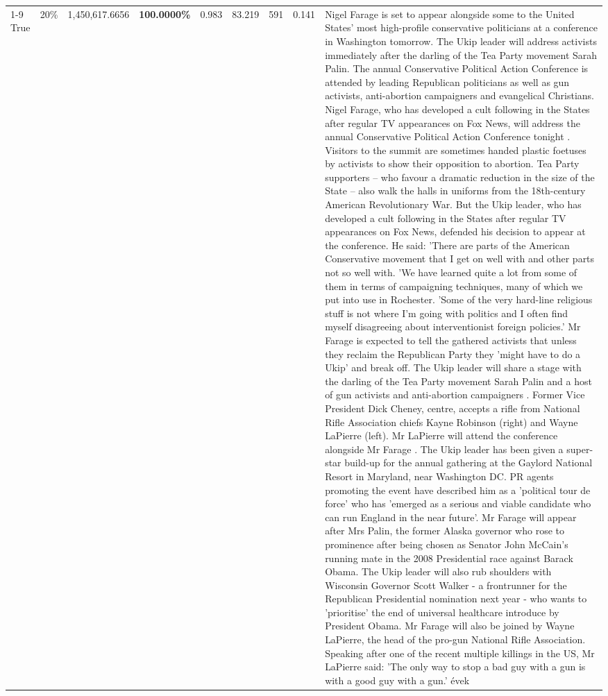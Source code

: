 \begin{table}[H]
\begin{tabular}{lllrlllll}
\cline{1-9} \cline{2-9}
True & 20\% & 1,450,617.6656 & \bfseries \color{red} 100.0000\% & 0.983 & 83.219 & 591 & 0.141 & Nigel Farage is set to appear alongside some to the United States' most high-profile conservative politicians at a conference in Washington tomorrow. The Ukip leader will address activists immediately after the darling of the Tea Party movement Sarah Palin. The annual Conservative Political Action Conference is attended by leading Republican politicians as well as gun activists, anti-abortion campaigners and evangelical Christians. Nigel Farage, who has developed a cult following in the States after regular TV appearances on Fox News, will address the annual Conservative Political Action Conference tonight . Visitors to the summit are sometimes handed plastic foetuses by activists to show their opposition to abortion. Tea Party supporters – who favour a dramatic reduction in the size of the State – also walk the halls in uniforms from the 18th-century American Revolutionary War. But the Ukip leader, who has developed a cult following in the States after regular TV appearances on Fox News, defended his decision to appear at the conference. He said: 'There are parts of the American Conservative movement that I get on well with and other parts not so well with. 'We have learned quite a lot from some of them in terms of campaigning techniques, many of which we put into use in Rochester. 'Some of the very hard-line religious stuff is not where I'm going with politics and I often find myself disagreeing about interventionist foreign policies.' Mr Farage is expected to tell the gathered activists that unless they reclaim the Republican Party they 'might have to do a Ukip' and break off. The Ukip leader will share a stage with the darling of the Tea Party movement Sarah Palin and a host of gun activists and anti-abortion campaigners . Former Vice President Dick Cheney, centre, accepts a rifle from National Rifle Association chiefs Kayne Robinson (right) and Wayne LaPierre (left). Mr LaPierre will attend the conference alongside Mr Farage . The Ukip leader has been given a super-star build-up for the annual gathering at the Gaylord National Resort in Maryland, near Washington DC. PR agents promoting the event have described him as a 'political tour de force' who has 'emerged as a serious and viable candidate who can run England in the near future'. Mr Farage will appear after Mrs Palin, the former Alaska governor who rose to prominence after being chosen as Senator John McCain's running mate in the 2008 Presidential race against Barack Obama. The Ukip leader will also rub shoulders with Wisconsin Governor Scott Walker - a frontrunner for the Republican Presidential nomination next year - who wants to 'prioritise' the end of universal healthcare introduce by President Obama. Mr Farage will also be joined by Wayne LaPierre, the head of the pro-gun National Rifle Association. Speaking after one of the recent multiple killings in the US, Mr LaPierre said: 'The only way to stop a bad guy with a gun is with a good guy with a gun.' évek \\

\end{tabular}
\end{table}
